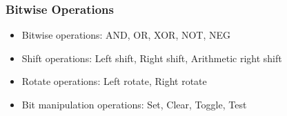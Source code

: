 \begin{frame}
    \frametitle{Bitwise Operations}
    \begin{itemize}
        \item Bitwise operations: AND, OR, XOR, NOT, NEG
        \item Shift operations: Left shift, Right shift, Arithmetic right shift
        \item Rotate operations: Left rotate, Right rotate
        \item Bit manipulation operations: Set, Clear, Toggle, Test
    \end{itemize}
\end{frame}

